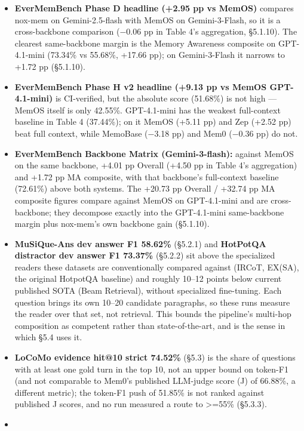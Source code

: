 \documentclass[
]{article}
\providecommand{\tightlist}{%
  \setlength{\itemsep}{0pt}\setlength{\parskip}{0pt}}
\begin{document}
\begin{itemize}
\tightlist
\item
  \textbf{EverMemBench Phase D headline (+2.95 pp vs MemOS)} compares
  nox-mem on Gemini-2.5-flash with MemOS on Gemini-3-Flash, so it is a
  cross-backbone comparison (−0.06 pp in Table 4's aggregation,
  §5.1.10). The clearest same-backbone margin is the Memory Awareness
  composite on GPT-4.1-mini (73.34\% vs 55.68\%, +17.66 pp); on
  Gemini-3-Flash it narrows to +1.72 pp (§5.1.10).
\item
  \textbf{EverMemBench Phase H v2 headline (+9.13 pp vs MemOS
  GPT-4.1-mini)} is CI-verified, but the absolute score (51.68\%) is not
  high --- MemOS itself is only 42.55\%. GPT-4.1-mini has the weakest
  full-context baseline in Table 4 (37.44\%); on it MemOS (+5.11 pp) and
  Zep (+2.52 pp) beat full context, while MemoBase (−3.18 pp) and Mem0
  (−0.36 pp) do not.
\item
  \textbf{EverMemBench Backbone Matrix (Gemini-3-flash):} against MemOS
  on the same backbone, +4.01 pp Overall (+4.50 pp in Table 4's
  aggregation) and +1.72 pp MA composite, with that backbone's
  full-context baseline (72.61\%) above both systems. The +20.73 pp
  Overall / +32.74 pp MA composite figures compare against MemOS on
  GPT-4.1-mini and are cross-backbone; they decompose exactly into the
  GPT-4.1-mini same-backbone margin plus nox-mem's own backbone gain
  (§5.1.10).
\item
  \textbf{MuSiQue-Ans dev answer F1 58.62\%} (§5.2.1) and
  \textbf{HotPotQA distractor dev answer F1 73.37\%} (§5.2.2) sit above
  the specialized readers these datasets are conventionally compared
  against (IRCoT, EX(SA), the original HotpotQA baseline) and roughly
  10--12 points below current published SOTA (Beam Retrieval), without
  specialized fine-tuning. Each question brings its own 10--20 candidate
  paragraphs, so these runs measure the reader over that set, not
  retrieval. This bounds the pipeline's multi-hop composition as
  competent rather than state-of-the-art, and is the sense in which §5.4
  uses it.
\item
  \textbf{LoCoMo evidence hit@10 strict 74.52\%} (§5.3) is the share of
  questions with at least one gold turn in the top 10, not an upper
  bound on token-F1 (and not comparable to Mem0's published LLM-judge
  score (J) of 66.88\%, a different metric); the token-F1 push of
  51.85\% is not ranked against published J scores, and no run measured
  a route to \textgreater=55\% (§5.3.3).
\item

\end{itemize}
\end{document}
